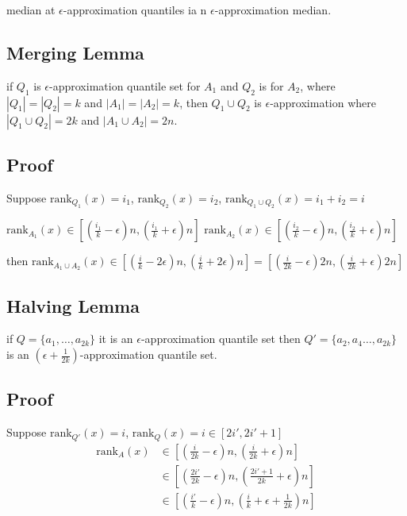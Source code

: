 \documentclass[english,12pt]{article}
\theoremstyle{plain}
\theoremstyle{definition}
\theoremstyle{definition} %
\begin{document}
median at $\epsilon$-approximation quantiles ia n $\epsilon$-approximation median.

\subsection{Merging Lemma}
if $Q_1$ is $\epsilon$-approximation quantile set for $A_1$ and $Q_2$ is for $A_2$, where $|Q_1|=|Q_2|=k$ and $|A_1|=|A_2|=k$, then $Q_1\cup Q_2$ is $\epsilon$-approximation where $|Q_1\cup Q_2|=2k$ and $|A_1\cup A_2|=2n$.

\subsection{Proof}
Suppose $\text{rank}_{Q_1}(x) = i_1$, $\text{rank}_{Q_2}(x) = i_2$, $\text{rank}_{Q_1\cup Q_2}(x) = i_1+i_2=i$

$\text{rank}_{A_1}(x) \in \left[\left(\frac{i_1}{k}-\epsilon\right)n, \left(\frac{i_1}{k}+\epsilon\right)n\right]$
$\text{rank}_{A_2}(x) \in \left[\left(\frac{i_2}{k}-\epsilon\right)n, \left(\frac{i_2}{k}+\epsilon\right)n\right]$


then $\text{rank}_{A_1\cup A_2}(x)\in \left[\left(\frac{i}{k}-2\epsilon\right)n, \left(\frac{i}{k}+2\epsilon\right)n\right] = \left[\left(\frac{i}{2k}-\epsilon\right)2n, \left(\frac{i}{2k}+\epsilon\right)2n\right]$

\subsection{Halving Lemma}
if $Q=\{a_1,\ldots, a_{2k}\}$ it is an $\epsilon$-approximation quantile set then $Q'=\{a_2,a_4\ldots, a_{2k}\}$ is an $\left(\epsilon + \frac{1}{2k}\right)$-approximation quantile set.

\subsection{Proof}
Suppose $\text{rank}_{Q'}(x) = i$, $\text{rank}_Q(x) = i\in \left[2i', 2i'+1\right]$
\begin{align*}
\text{rank}_A(x)&\in \left[\left(\frac{i}{2k}-\epsilon\right)n, \left(\frac{i}{2k}+\epsilon\right)n\right]\\
&\in \left[\left(\frac{2i'}{2k}-\epsilon\right)n, \left(\frac{2i'+1}{2k}+\epsilon\right)n\right]\\
&\in \left[\left(\frac{i'}{k}-\epsilon\right)n, \left(\frac{i}{k}+\epsilon+\frac{1}{2k}\right)n\right]
\end{align*}
\end{document}
